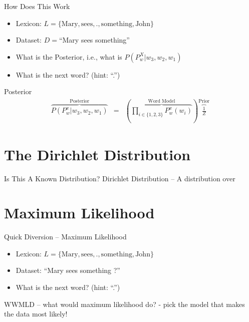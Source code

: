 \documentclass[11pt]{beamer}
\begin{document}
	\begin{frame}{How Does This Work}
		\begin{itemize}
			\item Lexicon: $L = \lbrace \text{Mary}, \text{sees}, \text{.}, \text{something}, \text{John}  \rbrace$
			\item Dataset: $D=$``Mary sees something''
			\item What is the Posterior, i.e., what is $P(P_{w}^X \vert w_3,w_2,w_1)$
			\item What is the next word? (hint: ``.'')
		\end{itemize}
	\end{frame}
	
	\begin{frame}{Posterior}
		\begin{align*}
			\overbrace{P(P_{w}^x \vert w_3,w_2,w_1)}^{\text{Posterior}} & = & \left(\overbrace{\prod_{i \in \{1,2,3\}} P_{w}^{x}(w_i)}^{\text{Word Model}}\right) \overbrace{\frac{1}{Z}}^{\text{Prior}}
		\end{align*}
	\end{frame}
	
	\section{The Dirichlet Distribution}
	
	\begin{frame}{Is This A Known Distribution?}
		Dirichlet Distribution -- A distribution over 
	\end{frame}
	
	\section{Maximum Likelihood}
	
	\begin{frame}{Quick Diversion -- Maximum Likelihood}
		\begin{itemize}
			\item Lexicon: $L = \lbrace \text{Mary}, \text{sees}, \text{.}, \text{something}, \text{John}  \rbrace$
			\item Dataset: ``Mary sees something ?''
			\item What is the next word? (hint: ``.'')
		\end{itemize}
		
		WWMLD -- what would maximum likelihood do? - pick the model that makes the data most likely!
	\end{frame}
	
\end{document}
